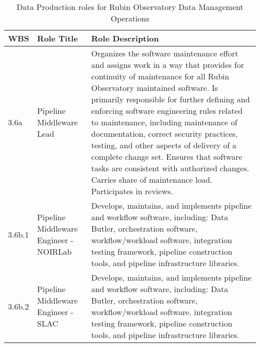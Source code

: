 \normalsize \begin{longtable} {|p{}|p{}|p{}|} \caption{Data Production roles for Rubin Observatory Data Management Operations \label{tab:dproles}}\\ 
\hline 
\textbf{WBS}&\textbf{Role Title}&\textbf{Role Description} \\ \hline
{3.6a}&{Pipeline Middleware Lead}&{Organizes the software maintenance effort and assigns work in a way that provides for continuity of maintenance for all Rubin Observatory maintained software. Is primarily responsible for further defining and enforcing software engineering rules related to maintenance, including maintenance of documentation, correct security practices, testing, and other aspects of delivery of a complete change set. Ensures that software tasks are consistent with authorized changes. Carries share of maintenance load. Participates in reviews.} \\ \hline
{3.6b.1}&{Pipeline Middleware Engineer - NOIRLab}&{Develops, maintains, and implements pipeline and workflow software, including: Data Butler, orchestration software, workflow/workload software, integration testing framework, pipeline construction tools, and pipeline infrastructure libraries.} \\ \hline
{3.6b.2}&{Pipeline Middleware Engineer - SLAC}&{Develops, maintains, and implements pipeline and workflow software, including: Data Butler, orchestration software, workflow/workload software, integration testing framework, pipeline construction tools, and pipeline infrastructure libraries.} \\ \hline
\end{longtable} \normalsize
